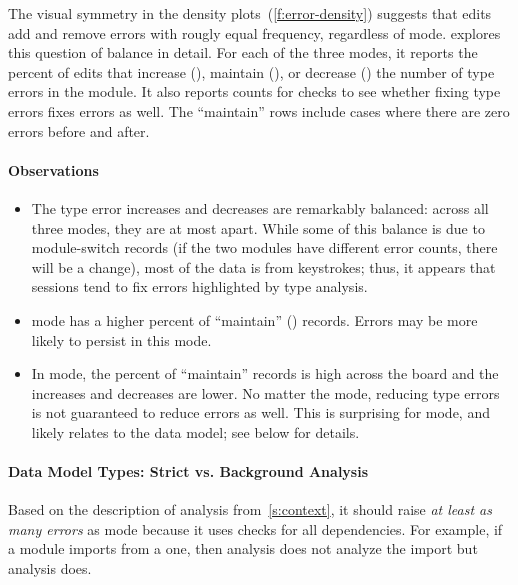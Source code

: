 \documentclass[english,submission,cleveref]{programming}
\begin{document}
The visual symmetry in the density plots~(\cref{f:error-density})
suggests that edits add and remove errors with rougly equal frequency,
regardless of mode.
 explores this question of balance in detail.
For each of the three modes, it reports the percent of edits that increase (\addsym{}),
maintain (\keepsym{}), or decrease (\dropsym{}) the number of type
errors in the module.
It also reports counts for \FS{} checks to see whether fixing type errors fixes
\FS{} errors as well.
The ``maintain'' rows include cases where there are zero errors before and after.


\paragraph{Observations}

\begin{itemize}
  \item
    The type error increases and decreases are remarkably balanced: across all
    three modes, they are at most  apart.
    While some of this balance is due to module-switch records
    (if the two modules have different error counts, there will be a change),
    most of the data is from keystrokes; thus, it appears that sessions tend to
    fix errors highlighted by type analysis.

  \item
    \mstrict{} mode has a higher percent of ``maintain'' (\keepsym{}) records.
    Errors may be more likely to persist in this mode.

  \item
    In \FS{} mode, the percent of ``maintain'' records is high across
    the board and the increases and decreases are lower.
    No matter the mode, reducing type errors is not guaranteed to reduce
    \FS{} errors as well.
    This is surprising for \mstrict{} mode, and likely relates to
    the data model; see below for details.

\end{itemize}


\paragraph{Data Model Types: Strict vs. Background Analysis}

Based on the description of \FS{} analysis from~\cref{s:context},
it should raise \emph{at least as many errors} as \mstrict{} mode
because it uses \mstrict{} checks for all dependencies.
For example, if a \mstrict{} module imports from a \mnocheck{} one,
then \mstrict{} analysis does not analyze the import but
\FS{} analysis does.
\end{document}

